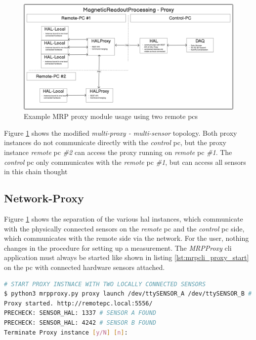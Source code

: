 \begin{figure}
\centering
\includegraphics{./generated_images/border_Example_MRP_proxy_module_usage_using_two_remote_(+pc)s.png}
\caption{Example MRP proxy module usage using two remote \gls{pc}s
\label{Example_MRP_proxy_module_usage_using_two_remote_(+pc)s.png}}
\end{figure}

Figure \ref{Example_MRP_proxy_module_usage_using_two_remote_(+pc)s.png}
shows the modified \emph{multi-proxy - multi-sensor} topology. Both
proxy instances do not communicate directly with the \emph{control}
\gls{pc}, but the proxy instance \emph{remote} \gls{pc} \emph{\#2} can
access the proxy running on \emph{remote} \gls{pc} \emph{\#1}. The
\emph{control} \gls{pc} only communicates with the \emph{remote}
\gls{pc} \emph{\#1}, but can access all sensors in this chain thought

\hypertarget{network-proxy}{%
\subsection{Network-Proxy}\label{network-proxy}}

Figure \ref{Example_MRP_proxy_module_usage_using_two_remote_(+pc)s.png}
shows the separation of the various \gls{hal} instances, which
communicate with the physically connected sensors on the \emph{remote}
\gls{pc} and the \emph{control} \gls{pc} side, which communicates with
the remote side via the network. For the user, nothing changes in the
procedure for setting up a measurement. The \emph{MRPProxy} \gls{cli}
application must always be started like shown in listing
\ref{lst:mrpcli_proxy_start} on the \gls{pc} with connected hardware
sensors attached.

\begin{lstlisting}[language=bash, caption={MRPProxy usage to enable local sensor forwarding over the network. The CLI output shows the available sensor to the connected host PC}, label=lst:mrpcli_proxy_start]
# START PROXY INSTNACE WITH TWO LOCALLY CONNECTED SENSORS
$ python3 mrpproxy.py proxy launch /dev/ttySENSOR_A /dev/ttySENSOR_B # add another proxy instance http://proxyinstance_2.local for multi-sensor, multi-proxy chain
Proxy started. http://remotepc.local:5556/
PRECHECK: SENSOR_HAL: 1337 # SENSOR A FOUND
PRECHECK: SENSOR_HAL: 4242 # SENSOR B FOUND
Terminate Proxy instance [y/N] [n]: 
\end{lstlisting}

